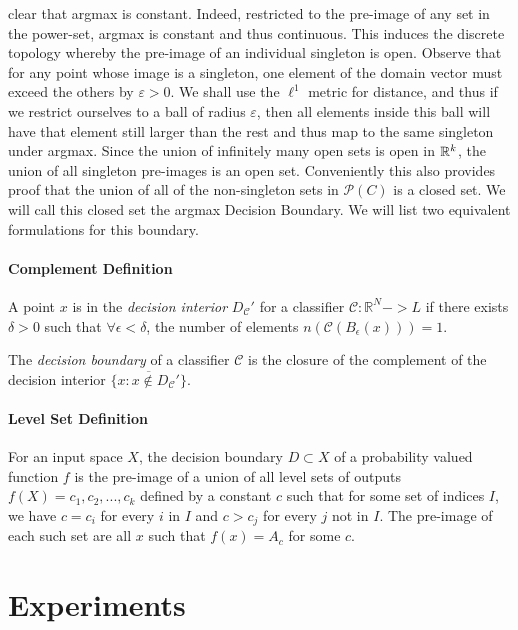 clear that argmax is constant.  Indeed, restricted to the pre-image of
any set in the power-set, argmax is constant and thus
continuous. This induces the discrete topology whereby the pre-image
of an individual singleton is open. Observe that for any point whose
image is a singleton, one element of the domain vector must exceed the 
others by $\varepsilon > 0$. We shall use the $\ell^1$ metric for
distance, and thus if we restrict ourselves to a ball of radius
$\varepsilon$, then all elements inside this ball will have that
element still larger than the rest and thus map to the same singleton
under argmax. Since the union of infinitely many open sets is open in
$\mathbb{R}^k$, the union of all singleton pre-images is an open
set. Conveniently this also provides proof that the union of all of
the non-singleton sets in $\mathcal{P}(C)$ is a closed set. We will
call this closed set the argmax Decision Boundary. We will list two
equivalent formulations for this boundary.  

\paragraph{Complement Definition}

A point $x$ is in the \emph{decision interior} $D_{\mathcal{C}}'$ for
a classifier $\mathcal{C}: \mathbb{R}^N -> L$ if there exists $\delta
> 0$ such that $\forall \epsilon < \delta$, the number of elements $n(\mathcal{C}(B_\epsilon(x))) = 1$. 

The \emph{decision boundary} of a classifier $\mathcal{C}$ is the closure of the complement of the decision interior $\overline{\{x : x \notin D_{\mathcal{C}}'\}}$. 

\paragraph{Level Set Definition}

For an input space $X$, the decision boundary $D \subset X$ of a probability valued function $f$ is the pre-image of a union of all level sets of outputs $f(X) = {c_1, c_2, ..., c_k}$ defined by a constant $c$ such that for some set of indices $I$, we have $c = c_i$ for every $i$ in $I$ and $c > c_j$ for every $j$ not in $I$. The pre-image of each such set are all $x$ such that $f(x) = A_c$ for some $c$. 

\section{Experiments} \label{sec:experiments}

